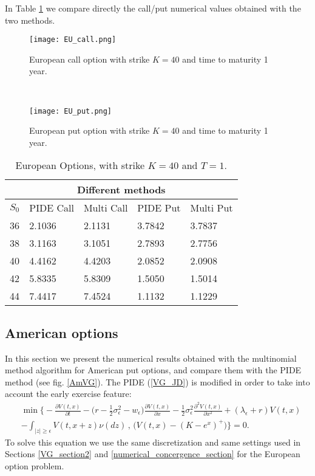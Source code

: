 In Table \ref{Option_values} we compare directly the call/put numerical values obtained with the two methods.
\begin{figure}[t!]
 \begin{minipage}[b]{0.5\linewidth}
   \centering
 \texttt{[image: EU\_call.png]}
 \caption{European call option with strike $K=40$ and time to maturity 1 year.}
 \label{figCall}
  \end{minipage}
 \ \hspace{2mm} \hspace{3mm} \
 \begin{minipage}[b]{0.5\linewidth}
 \centering
 \texttt{[image: EU\_put.png]}
 \caption{European put option with strike $K=40$ and time to maturity 1 year.}
 \label{figPut}
 \end{minipage}
\end{figure}

\begin{table}[ht]
\centering
{\begin{tabular}{lllll} 
\toprule
\multicolumn{5}{c}{Different methods} \\
\midrule
$S_0$ & PIDE Call & Multi Call & PIDE Put & Multi Put \\
\midrule
36 & 2.1036 & 2.1131 & 3.7842 & 3.7837  \\
  38 & 3.1163 & 3.1051 & 2.7893 & 2.7756 \\
  40 & 4.4162 & 4.4203 & 2.0852 & 2.0908 \\
  42 & 5.8335 & 5.8309 & 1.5050 & 1.5014 \\
  44 & 7.4417 & 7.4524 & 1.1132 & 1.1229 \\
\bottomrule
\end{tabular}}
\caption{European Options, with strike $K=40$ and $T=1$.}
\label{Option_values}
\end{table}



\subsection{American options}

In this section we present the numerical results obtained with the multinomial method algorithm for American put options, and compare them with the PIDE method (see fig. \ref{AmVG}).
The PIDE (\ref{VG_JD}) is modified in order to take into account the early exercise feature:
\begin{align}\label{VG_Am_JD}
&  \min \biggl\{ - \frac{\partial V(t,x)}{\partial t} -
 \bigl( r-\frac{1}{2}\sigma_{\epsilon}^2 - w_{\epsilon} \bigr) \frac{\partial V(t,x)}{\partial x} 
 - \frac{1}{2}\sigma_{\epsilon}^2 \frac{\partial^2 V(t,x)}{\partial x^2} + (\lambda_{\epsilon} + r) V(t,x) \\ \nonumber
 &- \int_{|z| \geq \epsilon} V(t,x+z) \nu(dz) \, , \, \biggl( V(t,x) - (K-e^x)^+ \biggr) \biggr\} = 0.
\end{align}
To solve this equation we use the same discretization and same settings used in Sections \ref{VG_section2} and \ref{numerical_concergence_section} for the European option problem.


